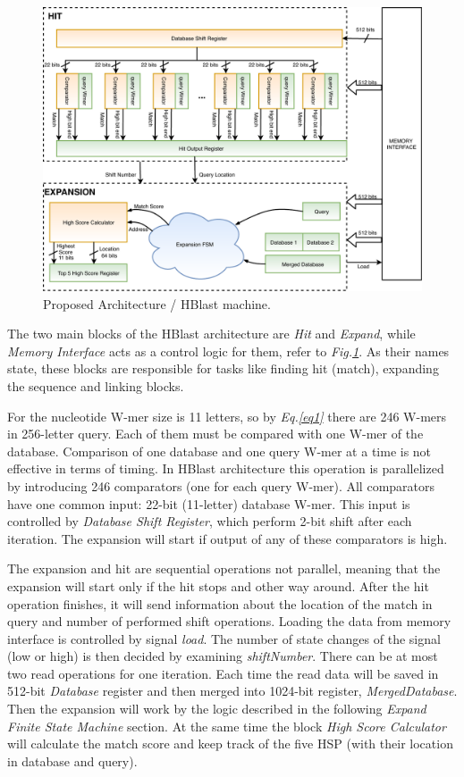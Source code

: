 \begin{figure}[h!]
\centering
\includegraphics[width=\columnwidth]{Figures/BlastMachine.pdf}
\caption{Proposed Architecture / HBlast machine.} \label{fig:blastArch}
\end{figure}

The two main blocks of the HBlast architecture are \textit{Hit} and \textit{Expand}, while \textit{Memory Interface} acts as a control logic for them, refer to \textit{Fig.\ref{fig:blastArch}}. As their names state, these blocks are responsible for tasks like finding hit (match), expanding the sequence and linking blocks. 

For the nucleotide W-mer size is 11 letters, so by \textit{Eq.\ref{eq1}} there are 246 W-mers in 256-letter query. Each of them must be compared with one W-mer of the database.  Comparison of one database and one query W-mer at a time is not effective in terms of timing. In HBlast architecture this operation is parallelized by introducing 246 comparators (one for each query W-mer). All comparators have one common input: 22-bit (11-letter) database W-mer. This input is controlled by \textit{Database Shift Register}, which perform 2-bit shift after each iteration. The expansion will start if output of any of these comparators is high. 



The expansion and hit are sequential operations not parallel, meaning that the expansion will start only if the hit stops and other way around. After the hit operation finishes, it will send information about the location of the match in query and number of performed shift operations. Loading the data from memory interface is controlled by signal \textit{load}. The number of state changes of the signal (low or high) is then decided by examining \textit{shiftNumber}. There can be at most two read operations for one iteration. Each time the read data will be saved in 512-bit \textit{Database} register and then merged into 1024-bit register, \textit{MergedDatabase}. Then the expansion will work by the logic described in the following \textit{Expand Finite State Machine} section. 
At the same time the block \textit{High Score Calculator} will calculate the match score and keep track of the five HSP (with their location in database and query).    



